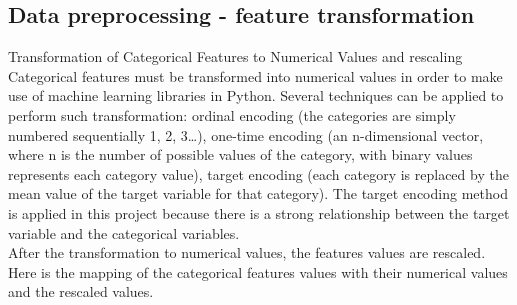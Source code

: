 \documentclass[11pt,a4paper]{article}
\begin{document}
\subsection{Data preprocessing - feature transformation} 
Transformation of Categorical Features to Numerical Values and rescaling
Categorical features must be transformed into numerical values in order to make use of machine learning libraries in Python. Several techniques can be applied to perform such transformation: ordinal encoding (the categories are simply numbered sequentially 1, 2, 3…), one-time encoding (an n-dimensional vector, where n is the number of possible values of the category, with binary values represents each category value), target encoding (each category is replaced by the mean value of the target variable for that category). The target encoding method is applied in this project because there is a strong relationship between the target variable and the categorical variables.
\\
After the transformation to numerical values, the features values are rescaled. Here is the mapping of the categorical features values with their numerical values and the rescaled values.
\\
\end{document}
